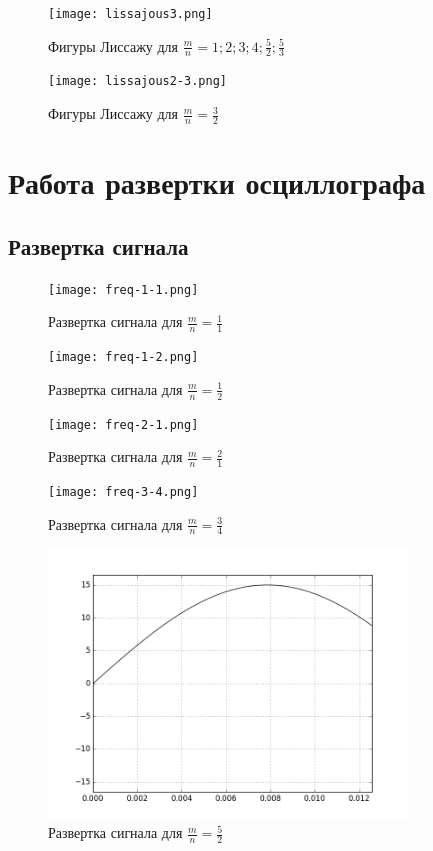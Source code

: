 \begin{figure}[H]
	\centering
	\texttt{[image: lissajous3.png]}
	\caption{Фигуры Лиссажу для $\frac{m}{n}=1;2;3;4;\frac{5}{2};\frac{5}{3}$}
	\label{fig:lissajous-1}
\end{figure}

\begin{figure}[H]
	\centering
	\texttt{[image: lissajous2-3.png]}
	\caption{Фигуры Лиссажу для $\frac{m}{n}=\frac{3}{2}$}
	\label{fig:lissajous-2}
\end{figure}



\section{Работа развертки осциллографа}
\subsection{Развертка сигнала}
\begin{figure}[H]
	\centering
	\texttt{[image: freq-1-1.png]}
	\caption{Развертка сигнала для $\frac{m}{n}=\frac{1}{1}$}
	\label{fig:freq-1-1}
\end{figure}

\begin{figure}[H]
	\centering
	\texttt{[image: freq-1-2.png]}
	\caption{Развертка сигнала для $\frac{m}{n}=\frac{1}{2}$}
	\label{fig:freq-1-2}
\end{figure}

\begin{figure}[H]
	\centering
	\texttt{[image: freq-2-1.png]}
	\caption{Развертка сигнала для $\frac{m}{n}=\frac{2}{1}$}
	\label{fig:freq-2-1}
\end{figure}

\begin{figure}[H]
	\centering
	\texttt{[image: freq-3-4.png]}
	\caption{Развертка сигнала для $\frac{m}{n}=\frac{3}{4}$}
	\label{fig:freq-3-4}
\end{figure}

\begin{figure}[H]
	\centering
	\includegraphics[width=0.85\textwidth]{freq-5-2.png}
	\caption{Развертка сигнала для $\frac{m}{n}=\frac{5}{2}$}
	\label{fig:freq-5-2}
\end{figure}

